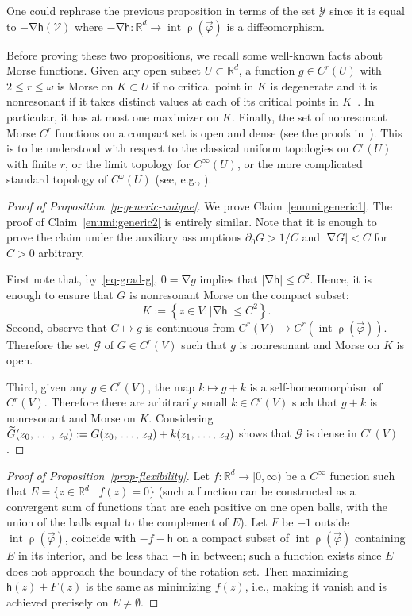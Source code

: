 \documentclass[AHL, Unicode, longabstracts,published]{cedram}
\theoremstyle{plain}
\theoremstyle{plain}
\newcommand\vpot{\vec\pot}
\newcommand\inter{\operatorname{int}}
\DeclareMathOperator{\interior}{int}
\newcommand{\rs}{\operatorname{\rho}}
\newcommand{\grad}{\operatorname{\nabla}}
\newcommand{\hf}{\mathsf{h}}
\newcommand{\pot}{\varphi}
\newcounter{In}
\newcommand*\8{\infty}
\newcommand\RR{\mathbb{R}}
\newcommand{\CG}{\mathcal{G}}
\newcommand{\scY}{\mathscr{Y}}
\newcommand{\scV}{\mathscr{V}}
\let\oldtilde\tilde
\renewcommand*{\tilde}[1]{\mathchoice{\widetilde{#1}}{\widetilde{#1}}{\oldtilde{#1}}{\oldtilde{#1}}}
\begin{document}
One could rephrase the previous proposition in terms of the set $\scY$ since it is equal to $-\grad \hf(\scV)$ where $-\grad\hf:\RR^d\to\inter\rs(\vpot)$ is a diffeomorphism.


Before proving these two propositions, we recall some well-known facts about Morse functions. Given any open subset $U\subset\RR^d$, a function $g\in C^r(U)$ with $2\leq r\leq\omega$ is Morse on $K\subset U$ if no critical point in $K$ is degenerate and it is nonresonant if it takes distinct values at each of its critical points in $K$~\cite[Definitions~1.1.7 and 1.2.11]{Nicolaescu}. In particular, it has at most one maximizer on $K$. Finally, the set of nonresonant Morse $C^r$ functions on a compact set is open and dense (see the proofs in~\cite[Section~1.2]{Nicolaescu}). This is to be understood with respect to the classical uniform topologies on $C^r(U)$ with finite $r$, or the limit topology for $C^\infty(U)$, or the more complicated standard topology of $C^\omega(U)$ (see, e.g., \cite[p.~53]{Krantz-Parks}).


\begin{proof}[Proof of Proposition~\ref{p-generic-unique}]
We prove Claim~\eqref{enumi:generic1}. The proof of Claim~\eqref{enumi:generic2} is entirely similar. Note that it is enough to prove the claim under the auxiliary assumptions $\partial_0 G>1/C$ and $\lvert \grad G\rvert < C$ for $C>0$ arbitrary.

First note that, by~\eqref{eq-grad-g}, $0=\grad g$ implies that $\lvert\grad \hf\rvert \leq C^2$. Hence, it is enough to ensure that $G$ is nonresonant Morse on the compact subset:
\[
K:=\left\{z\in V: \lvert\grad\hf\rvert\leq C^2\right\}.
\]
Second, observe that $G\mapsto g$ is continuous from $C^r(V)\to C^r(\interior\rs(\vpot))$. Therefore the set $\CG$ of $G\in C^r(V)$ such that $g$ is nonresonant and Morse on $K$ is open.

Third, given any $g\in C^r(V)$, the map $k\mapsto g+k$ is a self-homeomorphism of $C^r(V)$. Therefore there are arbitrarily small $k\in C^r(V)$ such that $g+k$ is nonresonant and Morse on $K$. Considering $\tilde G(z_0,\,\dots,\,z_d):=G(z_0,\,\dots,\,z_d)+k(z_1,\,\dots,\,z_d)$ shows that $\CG$ is dense in $C^r(V)$.
\end{proof}


\begin{proof}[Proof of Proposition~\ref{prop-flexibility}]
Let $f:\RR^d\to [0,\infty)$ be a $C^\infty$ function such that $E=\{ z\in\RR^d \mid f(z) = 0\}$ (such a function can be constructed as a convergent sum of functions that are each positive on one open balls, with the union of the balls equal to the complement of $E$). Let $F$ be $-1$ outside $\interior\rs(\vpot)$, coincide with $-f-\hf$ on a compact subset of $\interior\rs(\vpot)$ containing $E$ in its interior, and be less than $-\hf$ in between; such a function exists since $E$ does not approach the boundary of the rotation set. Then maximizing $\hf(z)+F(z)$ is the same as minimizing $f(z)$, i.e., making it vanish and is achieved precisely on $E\ne\emptyset$.
\end{proof}
\end{document}
